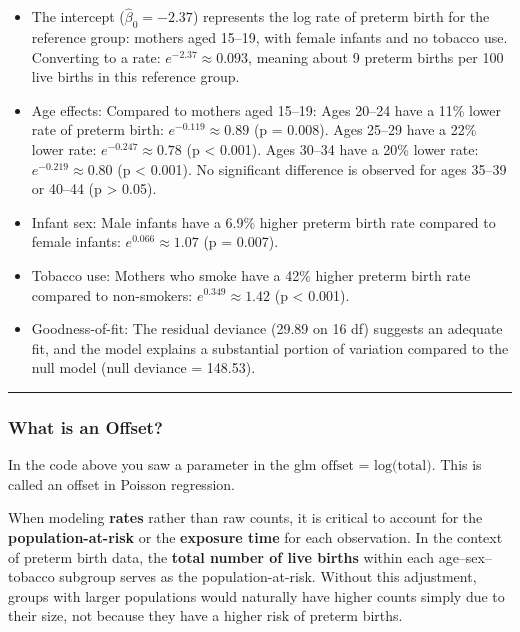 \documentclass[
  letterpaper,
  DIV=11,
  numbers=noendperiod]{scrreprt}
\begin{document}
\begin{itemize}
\item
  The intercept (\(\hat{\beta}_0 = -2.37\)) represents the log rate of
  preterm birth for the reference group: mothers aged 15--19, with
  female infants and no tobacco use. Converting to a rate:
  \(e^{-2.37} \approx 0.093\), meaning about 9 preterm births per 100
  live births in this reference group.
\item
  Age effects: Compared to mothers aged 15--19: Ages 20--24 have a 11\%
  lower rate of preterm birth: \(e^{-0.119} \approx 0.89\) (p = 0.008).
  Ages 25--29 have a 22\% lower rate: \(e^{-0.247} \approx 0.78\) (p
  \textless{} 0.001). Ages 30--34 have a 20\% lower rate:
  \(e^{-0.219} \approx 0.80\) (p \textless{} 0.001). No significant
  difference is observed for ages 35--39 or 40--44 (p \textgreater{}
  0.05).
\item
  Infant sex: Male infants have a 6.9\% higher preterm birth rate
  compared to female infants: \(e^{0.066} \approx 1.07\) (p = 0.007).
\item
  Tobacco use: Mothers who smoke have a 42\% higher preterm birth rate
  compared to non-smokers: \(e^{0.349} \approx 1.42\) (p \textless{}
  0.001).
\item
  Goodness-of-fit: The residual deviance (29.89 on 16 df) suggests an
  adequate fit, and the model explains a substantial portion of
  variation compared to the null model (null deviance = 148.53).
\end{itemize}

\begin{center}\rule{0.5\linewidth}{0.5pt}\end{center}

\hypertarget{what-is-an-offset}{%
\subsubsection*{What is an Offset?}\label{what-is-an-offset}}

In the code above you saw a parameter in the glm
\(\text{offset = log(total)}\). This is called an offset in Poisson
regression.

When modeling \textbf{rates} rather than raw counts, it is critical to
account for the \textbf{population-at-risk} or the \textbf{exposure
time} for each observation. In the context of preterm birth data, the
\textbf{total number of live births} within each age--sex--tobacco
subgroup serves as the population-at-risk. Without this adjustment,
groups with larger populations would naturally have higher counts simply
due to their size, not because they have a higher risk of preterm
births.
\end{document}
